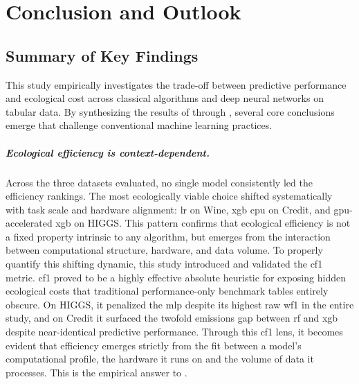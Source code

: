 \chapter{Conclusion and Outlook}
\label{conclusion}

\section{Summary of Key Findings}
\label{sec:summary}

This study empirically investigates the trade-off between predictive performance and ecological cost across classical algorithms and deep neural networks on tabular data. By synthesizing the results of  through , several core conclusions emerge that challenge conventional machine learning practices.

\paragraph{Ecological efficiency is context-dependent.}
Across the three datasets evaluated, no single model consistently led the efficiency rankings. The most ecologically viable choice shifted systematically with task scale and hardware alignment: \gls{lr} on Wine, \gls{xgb} \gls{cpu} on Credit, and \gls{gpu}-accelerated \gls{xgb} on HIGGS. This pattern confirms that ecological efficiency is not a fixed property intrinsic to any algorithm, but emerges from the interaction between computational structure, hardware, and data volume. To properly quantify this shifting dynamic, this study introduced and validated the \gls{cf1} metric. \Gls{cf1} proved to be a highly effective absolute heuristic for exposing hidden ecological costs that traditional performance-only benchmark tables entirely obscure. On HIGGS, it penalized the \gls{mlp} despite its highest raw \gls{wf1} in the entire study, and on Credit it surfaced the twofold emissions gap between \gls{rf} and \gls{xgb} despite near-identical predictive performance. Through this \gls{cf1} lens, it becomes evident that efficiency emerges strictly from the fit between a model's computational profile, the hardware it runs on and the volume of data it processes. This is the empirical answer to .

